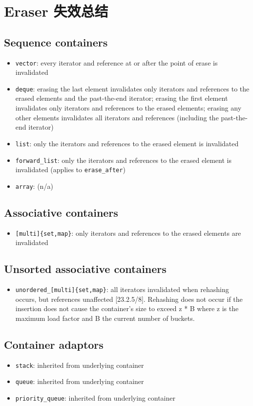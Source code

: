 \documentclass[UTF8,a4paper,12pt]{ctexbook}
\begin{document}
	\section{Eraser 失效总结}
		\subsection{Sequence containers}
			\begin{itemize}
				\item \verb|vector|: every iterator and reference at or after the point of erase is invalidated 
				\item \verb|deque|: erasing the last element invalidates only iterators and references to the erased elements and the past-the-end iterator; erasing the first element invalidates only iterators and references to the erased elements; erasing any other elements invalidates all iterators and references (including the past-the-end iterator)
				\item \verb|list|: only the iterators and references to the erased element is invalidated  
				\item \verb|forward_list|: only the iterators and references to the erased element is invalidated (applies to \verb|erase_after|) 
				\item \verb|array|: (n/a)
			\end{itemize}
		\subsection{Associative containers}
			\begin{itemize}
				\item \verb|[multi]{set,map}|:  only iterators and references to the erased elements are invalidated 
			\end{itemize}
		\subsection{Unsorted associative containers}
			\begin{itemize}
				\item \verb|unordered_[multi]{set,map}|: all iterators invalidated when rehashing occurs, but references unaffected [23.2.5/8]. Rehashing does not occur if the insertion does not cause the container's size to exceed z * B where z is the maximum load factor and B the current number of buckets.
			\end{itemize}
		
		\subsection{Container adaptors}
			\begin{itemize}
				\item \verb|stack|: inherited from underlying container
				\item \verb|queue|: inherited from underlying container
				\item \verb|priority_queue|: inherited from underlying container
			\end{itemize}
\end{document}
